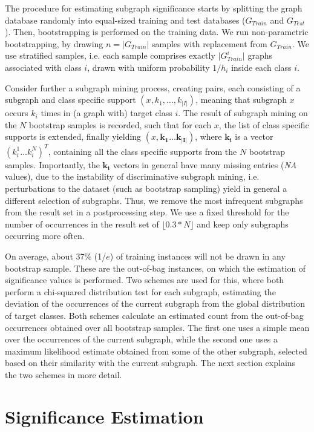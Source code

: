 \documentclass{article}
\begin{document}
The procedure for estimating subgraph significance starts by splitting the graph
database randomly into equal-sized training and test databases ($G_{Train}$ and
$G_{Test}$). Then, bootstrapping is performed on the training data. We run
non-parametric bootstrapping, by drawing $n=\vert G_{Train}\vert$ samples with
replacement from  $G_{Train}$. We use stratified samples, i.e. each sample
comprises exactly $\vert G_{Train}^i\vert$ graphs associated with class $i$, drawn with
uniform probability $1/h_i$ inside each class $i$.

Consider further a subgraph mining process, creating pairs, each consisting of
a subgraph and class specific support $(x,k_1,\ldots,k_{\vert I\vert})$,
meaning that subgraph $x$ occurs $k_i$ times in (a graph with) target class
$i$.  The result of subgraph mining on the $N$ bootstrap samples is recorded,
such that for each $x$, the list of class specific supports is extended, finally
yielding $(x,\mathbf{k_1}\ldots\mathbf{k_{\vert I\vert}})$, where $\mathbf{k_i}$
is a vector $(k_i^1\ldots k_i^N)^T$, containing all the class specific supports
from the $N$ bootstrap samples.
Importantly, the $\mathbf{k_i}$ vectors in general have many missing entries
(\emph{NA} values), due to the instability of discriminative subgraph mining, i.e.
perturbations to the dataset (such as bootstrap sampling) yield in general a
different selection of subgraphs. Thus, we remove the most infrequent subgraphs
from the result set in a postprocessing step. We use a fixed threshold for the number of occurrences in the result set of $\lfloor0.3*N\rfloor$ and keep only subgraphs occurring more often.

On average, about 37\% (1/$e$) of training instances will not be drawn in any
bootstrap sample. These are the out-of-bag instances, on which the estimation
of significance values is performed. Two schemes are used for this, where both
perform a chi-squared distribution test for each subgraph, estimating the
deviation of the occurrences of the current subgraph from the global
distribution of target classes. Both schemes calculate an estimated count from
the out-of-bag occurrences obtained over all bootstrap samples. The first one
uses a simple mean over the occurrences of the current subgraph, while the
second one uses a maximum likelihood estimate obtained from some of the other
subgraph, selected based on their similarity with the current subgraph. The next
section explains the two schemes in more detail.

\section{Significance Estimation}
\label{s:significance-estimation}
\end{document}
